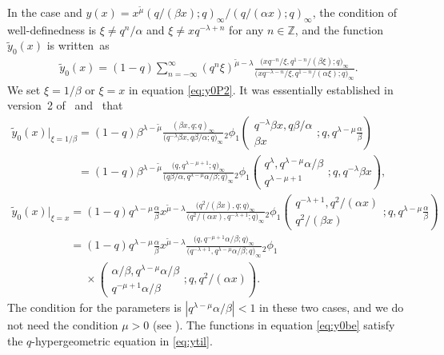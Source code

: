 \documentclass[pdftex]{sigma}
\numberwithin{equation}{section}
\theoremstyle{definition}
\begin{document}
In the case  and $y(x)= x^{\tilde{\mu }} (q/( \beta x) ;q)_{\infty}/(q/(\alpha x) ;q)_{\infty} $, the condition of well-definedness is $\xi \neq q^n/\alpha $ and $\xi \neq x q^{-\lambda +n } $ for any $n \in \mathbb{Z}$, and the function $\widetilde{y}_0(x)$ is written~as
\begin{gather} \label{eq:y0P2}
\widetilde{y}_0(x) = (1-q) \sum_{n=-\infty}^{\infty}(q^n\xi)^{\tilde{\mu } -\lambda } \frac{\bigl(x q^{-n} / \xi , q^{1-n} / (\beta \xi ) ; q\bigr)_{\infty}}{\bigl(x q^{-\lambda -n} / \xi , q^{1-n} / (\alpha \xi ) ; q\bigr)_{\infty}}.
\end{gather}
We set $\xi=1/\beta $ or $\xi= x $ in equation \eqref{eq:y0P2}.
It was essentially established in version~2 of~\cite{Ar} and~\cite{AT} that
\begin{gather}
 \widetilde{y}_0(x) |_{\xi=1/\beta }
 = (1-q) \beta^{\lambda-\tilde{\mu }} \frac{(\beta x, q ;q)_{\infty}}{\bigl(q^{-\lambda}\beta x, q\beta/\alpha ;q\bigr)_{\infty}}
{}_2\phi_1 \left( \begin{matrix} q^{-\lambda}\beta x,q\beta/\alpha\\
\beta x \end{matrix} ;q,q^{\lambda-\mu}\frac{\alpha}{\beta} \right)\nonumber \\
\phantom{ \widetilde{y}_0(x) |_{\xi=1/\beta }
 }{} = (1-q) \beta^{\lambda-\tilde{\mu }} \frac{\bigl(q, q^{\lambda-\mu+1} ;q\bigr)_{\infty}}{\bigl(q\beta/\alpha, q^{\lambda-\mu}\alpha/\beta ;q\bigr)_{\infty}}
{}_2\phi_1 \left( \begin{matrix} q^{\lambda},q^{\lambda-\mu}\alpha/\beta\\
 q^{\lambda-\mu+1} \end{matrix} ;q,q^{-\lambda}\beta x \right), \nonumber\\
 \widetilde{y}_0(x) |_{\xi= x }
 = (1-q) q^{\lambda - \mu} \frac{\alpha}{\beta} x^{\tilde{\mu } - \lambda}\frac{\bigl(q^2/(\beta x), q ;q\bigr)_{\infty}}{\bigl(q^2/(\alpha x),q^{-\lambda+1} ;q\bigr)_{\infty}}
{}_2\phi_1 \left( \begin{matrix} q^{-\lambda+1},q^2/(\alpha x)\\
q^2/(\beta x) \end{matrix} ;q,q^{\lambda-\mu}\frac{\alpha}{\beta} \right)\nonumber \\
\phantom{ \widetilde{y}_0(x) |_{\xi= x }
 }{} = (1-q) q^{\lambda-\mu} \frac{\alpha}{\beta} x^{\tilde{\mu } - \lambda} \frac{\bigl(q, q^{-\mu+1}\alpha/\beta ;q\bigr)_{\infty}}{\bigl(q^{-\lambda+1}, q^{\lambda-\mu}\alpha/\beta ;q\bigr)_{\infty}}
{}_2\phi_1\nonumber \\
\phantom{ \widetilde{y}_0(x) |_{\xi= x }
= }{}
\times\left( \begin{matrix} \alpha/\beta, q^{\lambda-\mu}\alpha/\beta\\
q^{-\mu+1}\alpha/\beta \end{matrix} ;q, q^2/(\alpha x) \right). \label{eq:y0be}
\end{gather}
The condition for the parameters is $|q^{\lambda - \mu} \alpha /\beta |<1$ in these two cases, and we do not need the condition $ \mu >0$ (see \cite{AT}).
The functions in equation \eqref{eq:y0be} satisfy the $q$-hypergeometric equation in \eqref{eq:ytil}.
\end{document}

